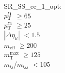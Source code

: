 SR\_SS\_ee\_1\_opt: \\
$p_{\text{T}}^{l1}$ $\geq 65$ \\
$p_{\text{T}}^{l2}$ $\geq 25$ \\
$|\Delta\eta_{ll}|$ $<1.5$ \\
$m_{\text{eff}}$ $\geq 200$ \\
$m_{\text{T}}^{\text{max}}$ $\geq 125$ \\
$m_{lj}$/$m_{ljj}$ $<105$ \\
